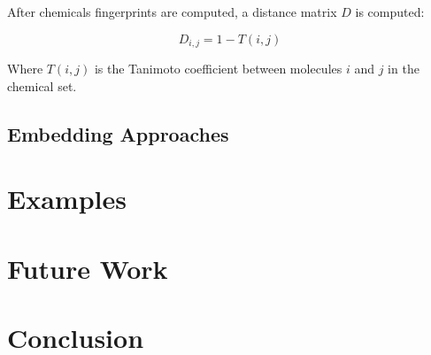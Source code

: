 \documentclass[12pt]{article}
\begin{document}
After chemicals fingerprints are computed, a distance matrix $D$ is computed:

\begin{equation}
  D_{i,j} = 1 - T(i,j)
\end{equation}

Where $T(i,j)$ is the Tanimoto coefficient between molecules $i$ and $j$ in the chemical set.



\subsection{Embedding Approaches}

\section{Examples}

\section{Future Work}

\section{Conclusion}

\newpage


\end{document}
